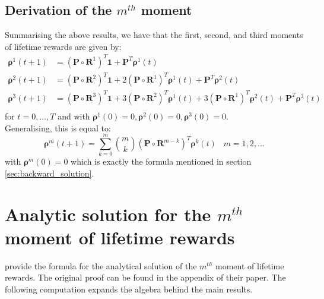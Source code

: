 \documentclass[\main/main.tex]{subfiles}
\begin{document}
\tocless\subsection{Derivation of the $m^{th}$ moment}

Summarising the above results, we have that the first, second, and third moments of lifetime rewards are given by:
\begin{equation}
    \begin{split}
     \bm{\rho}^1(t+1) &= (\mathbf{P} \circ \mathbf{R}^1) ^T\mathbf{1} + \mathbf{P}^T \bm{\rho}^1(t) \\
      \bm{\rho}^2(t+1) &= (\mathbf{P} \circ \mathbf{R}^2) ^ T\mathbf{1} + 2 (\mathbf{P} \circ \mathbf{R}^1) ^T \bm{\rho}^1(t) + 
      \mathbf{P}^T \bm{\rho}^2(t) \\
     \bm{\rho}^3(t+1) &= (\mathbf{P} \circ \mathbf{R}^3) ^ T\mathbf{1} + 3 (\mathbf{P} \circ \mathbf{R}^2) ^T \bm{\rho}^1(t) + 3 (\mathbf{P} \circ \mathbf{R}^1) ^T \bm{\rho}^2(t) + \mathbf{P}^T \bm{\rho}^3(t) \\
\end{split}
\end{equation}for $t=0, ... ,T$ and with $\bm{\rho}^1(0) = 0, \bm{\rho}^2(0) = 0,\bm{\rho}^3(0) = 0$.\\
Generalising, this is equal to:
\begin{equation}\label{recursive}
    \bm{\rho}^m(t+1) = \sum_{k=0}^{m} {m \choose k} (\mathbf{P} \circ \mathbf{R}^{m-k}) ^ T \bm{\rho}^k(t) \;\; \; m=1,2,...
\end{equation}
with $\bm{\rho}^m(0)=0$ which is exactly the formula mentioned in section \ref{sec:backward_solution}.\\


\tocless\section{Analytic solution for the $m^{th}$ moment of lifetime rewards}\label{sec:analytical_solution}

\cite{VanDaalen2017} provide the formula for the analytical solution of the $m^{th}$ moment of lifetime rewards. The original proof can be found in the appendix of their paper. The following computation expands the algebra behind the main results.\\
\end{document}
